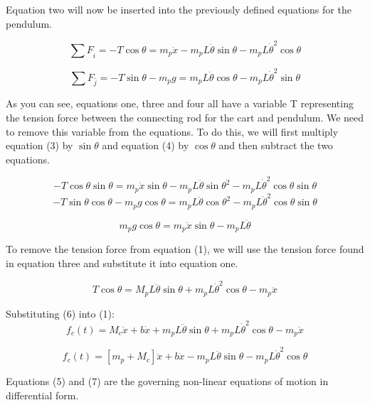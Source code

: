 \documentclass[titlepage]{article}
\begin{document}
Equation two will now be inserted into the previously defined equations for the pendulum.

\begin{equation}
\sum{}{F_{\hat{i}}} = -T\cos{\theta} = m_{p}\ddot{x} - m_{p}L\ddot{\theta}\sin{\theta} - m_{p}L\dot{\theta}^{2}\cos{\theta}
\end{equation}

\begin{equation}
\sum{}{F_{\hat{j}}} = -T\sin{\theta} - m_{p}g = m_{p}L\ddot{\theta}\cos{\theta} - m_{p}L\dot{\theta}^{2}\sin{\theta}
\end{equation}

As you can see, equations one, three and four all have a variable T representing the tension force between the connecting rod for the cart and pendulum. We need to remove this variable from the equations. To do this, we will first multiply equation (3) by \(\sin{\theta}\) and equation (4) by \(\cos{\theta}\) and then subtract the two equations.

\[-T\cos{\theta}\sin{\theta} = m_{p}\ddot{x}\sin{\theta} - m_{p}L\ddot{\theta}\sin{\theta}^2 - m_{p}L\dot{\theta}^{2}\cos{\theta}\sin{\theta}\]
\[-T\sin{\theta}\cos{\theta} - m_{p}g\cos{\theta} = m_{p}L\ddot{\theta}\cos{\theta}^2 - m_{p}L\dot{\theta}^{2}\cos{\theta}\sin{\theta}\]

\begin{equation}
m_{p}g\cos{\theta} = m_{p}\ddot{x}\sin{\theta} - m_{p}L\ddot{\theta}
\end{equation}

To remove the tension force from equation (1), we will use the tension force found in equation three and substitute it into equation one.

\begin{equation}
T\cos{\theta} = M_{p}L\ddot{\theta}\sin{\theta} + m_{p}L\dot{\theta}^{2}\cos{\theta} - m_{p}\ddot{x}
\end{equation}

Substituting (6) into (1):
\[ f_{c}\left(t\right) = M_{c}\ddot{x} + b\dot{x} +  m_{p}L\ddot{\theta}\sin{\theta} + m_{p}L\dot{\theta}^{2}\cos{\theta} - m_{p}\ddot{x}\]

\begin{equation}
f_{c}\left(t\right) = \left[m_{p} + M_{c}\right]\ddot{x} + b\dot{x} -  m_{p}L\ddot{\theta}\sin{\theta} - m_{p}L\dot{\theta}^{2}\cos{\theta}
\end{equation}

Equations (5) and (7) are the governing non-linear equations of motion in differential form.
\end{document}
